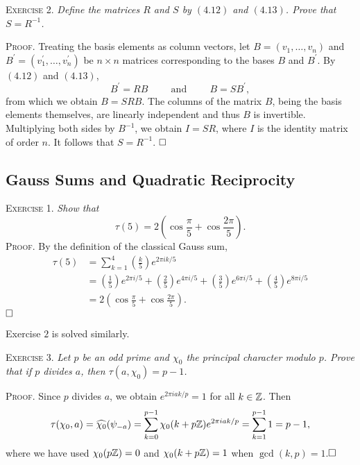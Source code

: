 \documentclass[11pt, leqno]{article}
\newcommand{\done}{\ensuremath{\hfill\square}}
\begin{document}
\textsc{Exercise 2}. \emph{Define the matrices $R$ and $S$ by $(4.12)$ and $(4.13)$. Prove that $S = R^{-1}$.}

\textsc{Proof}. Treating the basis elements as column vectors, let $B = ( v_1, \ldots, v_n)$ and $B^{\prime} = (v_1^{\prime}, \ldots, v_n^{\prime})$ be $n\times n$ matrices corresponding to the bases $B$ and $B^{\prime}$. By $(4.12)$ and $(4.13)$,
\begin{displaymath}
B^{\prime} = RB \hspace{1cm}\text{and}\hspace{1cm} B = SB^{\prime},
\end{displaymath}
from which we obtain $B = SRB$. The columns of the matrix $B$, being the basis elements themselves, are linearly independent and thus $B$ is invertible. Multiplying both sides by $B^{-1}$, we obtain $I = SR$, where $I$ is the identity matrix of order $n$. It follows that $S = R^{-1}$. \done

\subsection{Gauss Sums and Quadratic Reciprocity}

\textsc{Exercise 1}. \emph{Show that} 
\begin{displaymath}
\tau(5) = 2 \left( \cos \frac{\pi}{5} + \cos \frac{2\pi}{5} \right).
\end{displaymath}\textsc{Proof}. By the definition of the classical Gauss sum, 
\begin{align*}
  \tau(5) &= \sum_{k=1}^4 \left( \frac{k}{5} \right) e^{2\pi i k/5} \\
          &= \left( \frac{1}{5} \right) e^{2\pi i/5} + \left( \frac{2}{5} \right) e^{4\pi i/5} + \left( \frac{3}{5} \right) e^{6\pi i/5} + \left( \frac{4}{5} \right) e^{8\pi i/5} \\
          &= 2 \left( \cos \frac{\pi}{5} + \cos \frac{2\pi}{5} \right).
\end{align*}
\done

Exercise $2$ is solved similarly.

\textsc{Exercise 3}. \emph{Let $p$ be an odd prime and $\chi_0$ the principal character modulo $p$. Prove that if $p$ divides $a$, then $\tau(a, \chi_0) = p-1$.}

\textsc{Proof}. Since $p$ divides $a$, we obtain $e^{2\pi i a k/p} = 1$ for all $k \in \mathbb{Z}$. Then 
\begin{align*}
  \tau(\chi_0, a) = \widehat{\chi_0}(\psi_{-a}) = \sum_{k=0}^{p-1} \chi_0(k+ p\mathbb{Z}) e^{2\pi i ak/p} = \sum_{k=1}^{p-1} 1 = p-1,
\end{align*}
where we have used $\chi_0(p\mathbb{Z}) = 0$ and $\chi_0(k + p\mathbb{Z}) = 1$ when $\gcd(k, p) = 1$.\done
\end{document}

